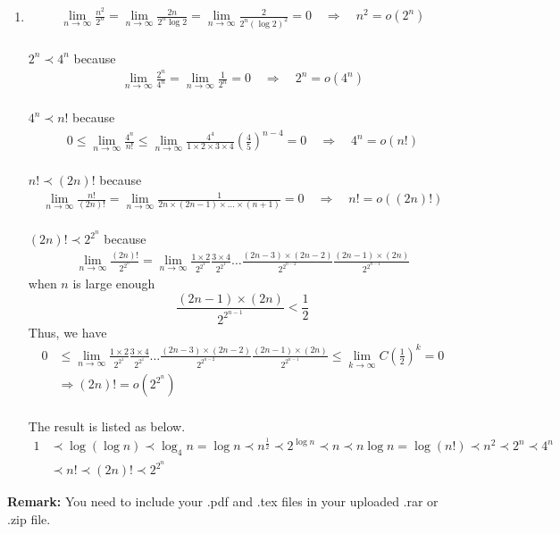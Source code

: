 \documentclass[12pt,a4paper]{article}
\makeatletter
\newtheorem*{solution}{Solution}
\theoremstyle{definition}
\renewenvironment{solution}[1][Solution] {\par\pushQED{\qed}\normalfont\topsep6\p@\@plus6\p@\relax\trivlist\item[\hskip\labelsep\bfseries#1\@addpunct{.}]\ignorespaces}{\popQED\endtrivlist\@endpefalse} \makeatother
\makeatother
\begin{document}
\begin{enumerate}
\begin{solution}
\begin{align}
          \lim_{n\to \infty}\frac{n^2}{2^n} =\lim_{n\to \infty}\frac{2n}{2^n\log 2}=\lim_{n\to \infty}\frac{2}{2^n(\log 2)^2}=0 \quad\Rightarrow\quad n^2 = o(2^n)
      \end{align}
      ~\\
      $ 2^n\prec 4^n$ because
      \begin{align}
          \lim_{n\to \infty}\frac{2^n}{4^n} =\lim_{n\to \infty}\frac{1}{2^n}=0 \quad\Rightarrow\quad 2^n = o(4^n)
      \end{align}
      ~\\
      $ 4^n\prec n!$ because
      \begin{align}
          0\leq\lim_{n\to \infty}\frac{4^n}{n!} \leq\lim_{n\to \infty}\frac{4^4}{1\times 2\times 3\times 4}(\frac{4}{5})^{n-4}=0 \quad\Rightarrow\quad 4^n = o(n!)
      \end{align}
      ~\\
      $ n!\prec (2n)!$ because
      \begin{align}
          \lim_{n\to \infty}\frac{n!}{(2n)!} =\lim_{n\to \infty}\frac{1}{2n\times(2n-1)\times\dots\times(n+1)}=0 \quad\Rightarrow\quad n! = o((2n)!)
      \end{align}
      ~\\
      $ (2n)!\prec 2^{2^n}$ because
      \begin{align}
          \lim_{n\to \infty}\frac{(2n)!}{2^{2^n}} =\lim_{n\to \infty}\frac{1\times2}{2^{2^1}}\frac{3\times4}{2^{2^1}}\dots\frac{(2n-3)\times(2n-2)}{2^{2^{n-2}}}\frac{(2n-1)\times(2n)}{2^{2^{n-1}}} 
      \end{align}
      when $n$ is large enough $$\frac{(2n-1)\times(2n)}{2^{2^{n-1}}}<\frac{1}{2}$$
      Thus, we have
      \begin{align}
          0&\leq\lim_{n\to \infty}\frac{1\times2}{2^{2^1}}\frac{3\times4}{2^{2^1}}\dots\frac{(2n-3)\times(2n-2)}{2^{2^{n-2}}}\frac{(2n-1)\times(2n)}{2^{2^{n-1}}} \leq\lim_{k\to \infty}C(\frac{1}{2})^k = 0\\
          &\Rightarrow (2n)! =  o(2^{2^n})
      \end{align}
      ~\\
      The result is listed as below.
    \begin{equation}
    \begin{split}
        1 &\prec  \log(\log n)  \prec  \log_4 n  = \log n  \prec  n^{\frac{1}{2}} 
    	\prec2^{\log n} \prec n \prec  n \log n = \log(n!) \prec  n^2 
    	\prec 2^n  \prec 4^n\\  &\prec n!  \prec   (2n)! \prec  2^{2^{n}}
    \end{split}
    \end{equation}
    \end{solution}
\end{enumerate}

\vspace{20pt}

\textbf{Remark:} You need to include your .pdf and .tex files in your uploaded .rar or .zip file.

\end{document}

